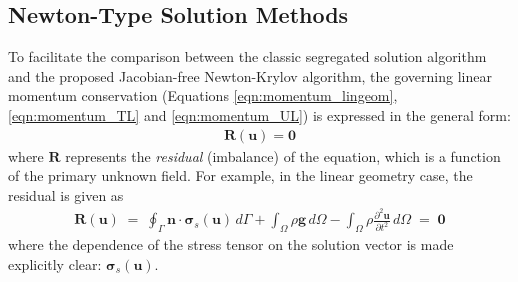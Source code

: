 \documentclass[sn-mathphys,Numbered]{sn-jnl}%
\newcommand{\bb}{\boldsymbol}
\begin{document}
\subsection{Newton-Type Solution Methods}
To facilitate the comparison between the classic segregated solution algorithm and the proposed Jacobian-free Newton-Krylov algorithm, the governing linear momentum conservation (Equations \ref{eqn:momentum_lingeom}, \ref{eqn:momentum_TL} and \ref{eqn:momentum_UL}) is expressed in the general form:
\begin{eqnarray} \label{eqn:residual}
	    \bb{R}(\bb{u}) = \bb{0}
\end{eqnarray}
where $\bb{R}$ represents the \emph{residual} (imbalance) of the equation, which is a function of the primary unknown field.
For example, in the linear geometry case, the residual is given as
\begin{eqnarray}
    \bb{R}(\bb{u})
    \;=\;
    \oint_{\Gamma} \bb{n} \cdot \bb{\sigma}_s(\bb{u}) \,  d\Gamma
    + \int_{\Omega}  \rho \bb{g} \, d\Omega
    -  \int_{\Omega} \rho \frac{\partial^2 \bb{u} }{\partial t^2} \, d\Omega
    \;=\; \bb{0}
\end{eqnarray}
where the dependence of the stress tensor on the solution vector is made explicitly clear: $\bb{\sigma}_s(\bb{u})$.
\end{document}
